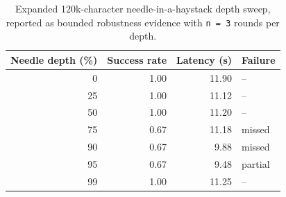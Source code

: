 \begin{table}[htbp]
\centering
\caption{Expanded 120k-character needle-in-a-haystack depth sweep, reported as bounded robustness evidence with \texttt{n = 3} rounds per depth.}
\label{tab:long-context-robustness}
\small
\setlength{\tabcolsep}{4pt}
\begin{tabular}{r r r l}
\hline
Needle depth (\%) & Success rate & Latency (s) & Failure \\
\hline
0 & 1.00 & 11.90 & -- \\
25 & 1.00 & 11.12 & -- \\
50 & 1.00 & 11.20 & -- \\
75 & 0.67 & 11.18 & missed \\
90 & 0.67 & 9.88 & missed \\
95 & 0.67 & 9.48 & partial \\
99 & 1.00 & 11.25 & -- \\
\hline
\end{tabular}
\end{table}
